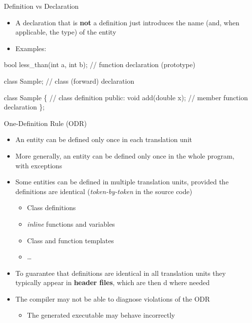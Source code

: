 \begin{frame}[fragile]{Definition vs Declaration \insertcontinuationtext}

  \begin{itemize}
  \item A \alert{declaration} that is \textbf{not} a definition just introduces
    the name (and, when applicable, the type) of the entity
  \item Examples:
  \end{itemize}

  \begin{codeblock}{
bool less_than(int a, int b); // function declaration (prototype)

class Sample; // class (forward) declaration

class Sample \{ // class definition
 public:
  void add(double x); // member function declaration
  \ddd
\};
}\end{codeblock}

\end{frame}

\begin{frame}{One-Definition Rule (ODR)}
  \begin{itemize}[<+->]
  \item An entity can be defined only once in each translation unit
  \item More generally, an entity can be defined only once in the whole program,
    with exceptions
  \item Some entities can be defined in multiple translation units, provided the
    definitions are identical (\textit{token-by-token} in the source code)
    \begin{itemize}[<.->]
    \item Class definitions
    \item \textit{inline} functions and variables
    \item Class and function templates
    \item \ldots
    \end{itemize}
  \item To guarantee that definitions are identical in all translation units
    they typically appear in \textbf{header files}, which are then
    d where needed
  \item The compiler may not be able to diagnose violations of the ODR
    \begin{itemize}
    \item The generated executable may behave incorrectly
    \end{itemize}
  \end{itemize}
\end{frame}

